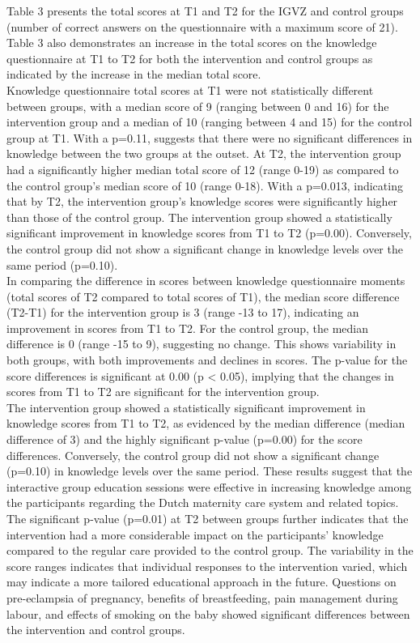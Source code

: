 \documentclass[12pt]{article}
\begin{document}
\noindent Table 3 presents the total scores at T1 and T2 for the IGVZ and control groups (number of correct answers on the questionnaire with a maximum score of 21). Table 3 also demonstrates an increase in the total scores on the knowledge questionnaire at T1 to T2 for both the intervention and control groups as indicated by the increase in the median total score. \\

\noindent Knowledge questionnaire total scores at T1 were not statistically different between groups, with a median score of 9 (ranging between 0 and 16) for the intervention group and a median of 10 (ranging between 4 and 15) for the control group at T1. With a p=0.11, suggests that there were no significant differences in knowledge between the two groups at the outset. At T2, the intervention group had a significantly higher median total score of 12 (range 0-19) as compared to the control group's median score of 10 (range 0-18). With a p=0.013, indicating that by T2, the intervention group's knowledge scores were significantly higher than those of the control group. The intervention group showed a statistically significant improvement in knowledge scores from T1 to T2 (p=0.00). Conversely, the control group did not show a significant change in knowledge levels over the same period (p=0.10).\\

\noindent In comparing the difference in scores between knowledge questionnaire moments (total scores of T2 compared to total scores of T1), the median score difference (T2-T1) for the intervention group is 3 (range -13 to 17), indicating an improvement in scores from T1 to T2. For the control group, the median difference is 0 (range -15 to 9), suggesting no change. This shows variability in both groups, with both improvements and declines in scores. The p-value for the score differences is significant at 0.00 (p \textless{} 0.05), implying that the changes in scores from T1 to T2 are significant for the intervention group. \\

\noindent The intervention group showed a statistically significant improvement in knowledge scores from T1 to T2, as evidenced by the median difference (median difference of 3) and the highly significant p-value (p=0.00) for the score differences. Conversely, the control group did not show a significant change (p=0.10) in knowledge levels over the same period. These results suggest that the interactive group education sessions were effective in increasing knowledge among the participants regarding the Dutch maternity care system and related topics. The significant p-value (p=0.01) at T2 between groups further indicates that the intervention had a more considerable impact on the participants' knowledge compared to the regular care provided to the control group. The variability in the score ranges indicates that individual responses to the intervention varied, which may indicate a more tailored educational approach in the future. Questions on pre-eclampsia of pregnancy, benefits of breastfeeding, pain management during labour, and effects of smoking on the baby showed significant differences between the intervention and control groups.\\
\end{document}
